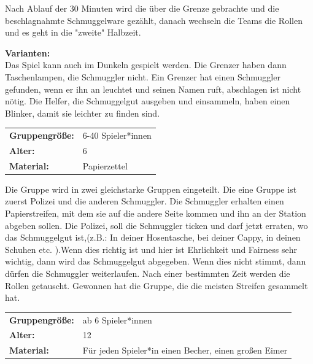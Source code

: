 Nach Ablauf der 30 Minuten wird die über die Grenze gebrachte und die beschlagnahmte Schmuggelware gezählt, danach wechseln die Teams die Rollen und es geht in die "zweite" Halbzeit.

\textbf{Varianten:}\\
Das Spiel kann auch im Dunkeln gespielt werden. Die Grenzer haben dann Taschenlampen, die Schmuggler nicht. Ein Grenzer hat einen Schmuggler gefunden, wenn er ihn an leuchtet und seinen Namen ruft, abschlagen ist nicht nötig. Die Helfer, die Schmuggelgut ausgeben und einsammeln, haben einen Blinker, damit sie leichter zu finden sind.


\begin{table}[H]
\begin{tabular}{>{\bfseries}lp{8cm}}
   Gruppengröße:   & 6-40 Spieler*innen\\
    Alter: & 6 \\
    Material: & Papierzettel \\ 
\end{tabular}
\end{table} 

Die Gruppe wird in zwei gleichstarke Gruppen eingeteilt. Die eine Gruppe ist zuerst Polizei und die anderen Schmuggler. Die Schmuggler erhalten einen Papierstreifen, mit dem sie auf die andere Seite kommen und ihn an der Station abgeben sollen. Die Polizei, soll die Schmuggler ticken und darf jetzt erraten, wo das Schmuggelgut ist,(z.B.: In deiner Hosentasche, bei deiner Cappy, in deinen Schuhen etc. ).Wenn dies richtig ist und hier ist Ehrlichkeit und Fairness sehr wichtig, dann wird das Schmuggelgut abgegeben.  Wenn dies nicht stimmt, dann dürfen die Schmuggler weiterlaufen. Nach einer bestimmten Zeit werden die Rollen getauscht. Gewonnen hat die Gruppe, die die meisten Streifen gesammelt hat.

\begin{table}[H]
\begin{tabular}{>{\bfseries}lp{8cm}}
   Gruppengröße:   & ab 6 Spieler*innen\\
    Alter: & 12 \\
    Material: & Für jeden Spieler*in einen Becher, einen großen Eimer \\ 
\end{tabular}
\end{table} 

